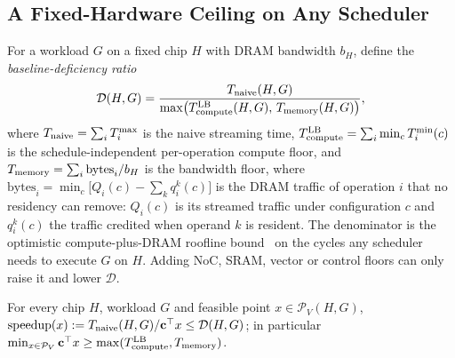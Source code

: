\subsection{A Fixed-Hardware Ceiling on Any Scheduler}
\label{app:deficiency}
For a workload $G$ on a fixed chip $H$ with DRAM bandwidth $b_H$, define the \emph{baseline-deficiency ratio}
\begin{equation}
\mathcal D(H,G)=\frac{T_{\rm naive}(H,G)}{\max\bigl(T^{\rm LB}_{\rm compute}(H,G),\,T_{\rm memory}(H,G)\bigr)},
\label{eq:deficiency}
\end{equation}
where $T_{\rm naive}=\sum_iT^{\max}_i$ is the naive streaming time, $T^{\rm LB}_{\rm compute}=\sum_i\min_cT^{\min}_i(c)$ is the schedule-independent per-operation compute floor, and $T_{\rm memory}=\sum_i\mathrm{bytes}_i/b_H$ is the bandwidth floor, where $\mathrm{bytes}_i=\min_c\bigl[Q_i(c)-\sum_kq^k_i(c)\bigr]$ is the DRAM traffic of operation $i$ that no residency can remove: $Q_i(c)$ is its streamed traffic under configuration $c$ and $q^k_i(c)$ the traffic credited when operand $k$ is resident.
The denominator is the optimistic compute-plus-DRAM roofline bound~\citep{williams2009roofline,huang2024mindthegap} on the cycles any scheduler needs to execute $G$ on $H$.
Adding NoC, SRAM, vector or control floors can only raise it and lower $\mathcal D$.
\begin{theorem}\label{thm:deficiency}
For every chip $H$, workload $G$ and feasible point $x\in\mathcal P_V(H,G)$, $\mathrm{speedup}(x):=T_{\rm naive}(H,G)/\mathbf c^\top x\le\mathcal D(H,G)$; in particular $\min_{x\in\mathcal P_V}\mathbf c^\top x\ge\max(T^{\rm LB}_{\rm compute},T_{\rm memory})$.
\end{theorem}
